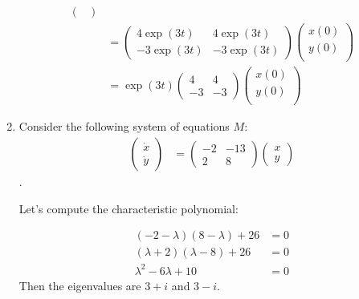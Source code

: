 \documentclass[12pt,letterpaper]{article}
\begin{document}
\begin{enumerate}[label=(\alph*)]
\begin{align}
\begin{pmatrix}
		      \end{pmatrix}\\
		                                 & =
		      \begin{pmatrix}
			      4\exp(3t)  & 4\exp(3t)  \\
			      -3\exp(3t) & -3\exp(3t)
		      \end{pmatrix}
		      \begin{pmatrix}
			      x(0) \\
			      y(0) \\
		      \end{pmatrix}\\
		                                 & =
		      \exp(3t)\begin{pmatrix}
			      4  & 4  \\
			      -3 & -3
		      \end{pmatrix}
		      \begin{pmatrix}
			      x(0) \\
			      y(0) \\
		      \end{pmatrix}
	      \end{align}

	\item Consider the following system of equations $M$:
	      \begin{align}
		      \begin{pmatrix}
			      \dot{x} \\
			      \dot{y}
		      \end{pmatrix} & = \begin{pmatrix}
			      -2 & -13 \\
			      2  & 8
		      \end{pmatrix}
		      \begin{pmatrix}
			      x \\
			      y
		      \end{pmatrix}
	      \end{align}.

	      Let's compute the characteristic polynomial:

	      \begin{align}
		      (-2 - \lambda)(8-\lambda) + 26  & = 0 \\
		      (\lambda + 2)(\lambda - 8) + 26 & = 0 \\
		      \lambda^2 -6 \lambda + 10       & = 0
	      \end{align}
	      Then the eigenvalues are $3 + i$ and  $3 - i$.


\end{enumerate}
\end{document}
